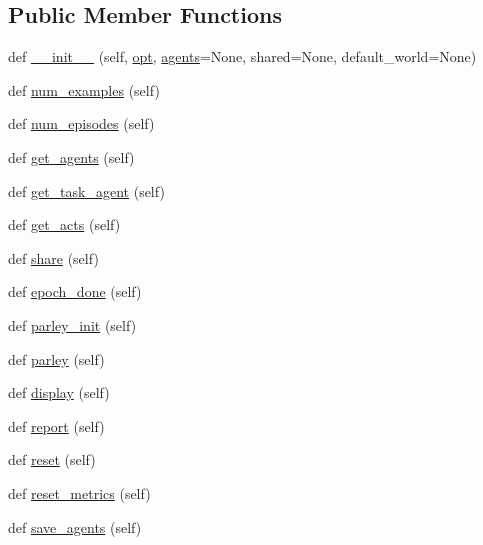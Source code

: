 \subsection*{Public Member Functions}
\begin{DoxyCompactItemize}
\item 
def \hyperlink{classparlai_1_1core_1_1worlds_1_1MultiWorld_abe32f537dd97543bbfdf51d417d81d9b}{\+\_\+\+\_\+init\+\_\+\+\_\+} (self, \hyperlink{classparlai_1_1core_1_1worlds_1_1World_a3640d92718acd3e6942a28c1ab3678bd}{opt}, \hyperlink{classparlai_1_1core_1_1worlds_1_1World_a728f75194cc26ea4035047c46cf62608}{agents}=None, shared=None, default\+\_\+world=None)
\item 
def \hyperlink{classparlai_1_1core_1_1worlds_1_1MultiWorld_ae62ad8500e4208ed99ffcf91707746e1}{num\+\_\+examples} (self)
\item 
def \hyperlink{classparlai_1_1core_1_1worlds_1_1MultiWorld_a3efde7408bd94052b0a4880aefbc5d0a}{num\+\_\+episodes} (self)
\item 
def \hyperlink{classparlai_1_1core_1_1worlds_1_1MultiWorld_a6e012b3db760d95f189baf3466fc55d0}{get\+\_\+agents} (self)
\item 
def \hyperlink{classparlai_1_1core_1_1worlds_1_1MultiWorld_a593c1eb833633014c2506abd80695317}{get\+\_\+task\+\_\+agent} (self)
\item 
def \hyperlink{classparlai_1_1core_1_1worlds_1_1MultiWorld_a73074f333544de25b4e07ffc48819896}{get\+\_\+acts} (self)
\item 
def \hyperlink{classparlai_1_1core_1_1worlds_1_1MultiWorld_ae780a8cfd7c6b675727cca24b8321015}{share} (self)
\item 
def \hyperlink{classparlai_1_1core_1_1worlds_1_1MultiWorld_a7034326fa264402e0857a98d1ec688de}{epoch\+\_\+done} (self)
\item 
def \hyperlink{classparlai_1_1core_1_1worlds_1_1MultiWorld_a9f2f4de7791e3b295359039e9d26a523}{parley\+\_\+init} (self)
\item 
def \hyperlink{classparlai_1_1core_1_1worlds_1_1MultiWorld_aae71b8182e17a1579352a52b56614b64}{parley} (self)
\item 
def \hyperlink{classparlai_1_1core_1_1worlds_1_1MultiWorld_a03a162a9c53ed806221e46762d3fcb52}{display} (self)
\item 
def \hyperlink{classparlai_1_1core_1_1worlds_1_1MultiWorld_aa89365baa3672e08d8e239199df4eda7}{report} (self)
\item 
def \hyperlink{classparlai_1_1core_1_1worlds_1_1MultiWorld_afcdadb92455ce41a8156390d876ebb96}{reset} (self)
\item 
def \hyperlink{classparlai_1_1core_1_1worlds_1_1MultiWorld_a7d52dd60bfa5654bfc4ad656ccb07fa1}{reset\+\_\+metrics} (self)
\item 
def \hyperlink{classparlai_1_1core_1_1worlds_1_1MultiWorld_a4d72a950f8aae3d248a9694908f0fc85}{save\+\_\+agents} (self)
\end{DoxyCompactItemize}
